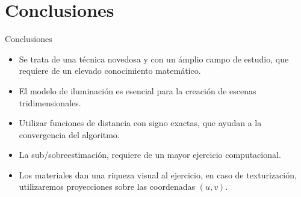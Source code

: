 \section{Conclusiones}

\SectionPage

\begin{frame}{Conclusiones}
    \begin{itemize}
        \item Se trata de una técnica novedosa y con un ámplio campo de estudio, que requiere de un elevado conocimiento matemático.
        \item El modelo de iluminación es esencial para la creación de escenas tridimensionales.
        \item Utilizar funciones de distancia con signo exactas, que ayudan a la convergencia del algoritmo.
        \item La sub/sobreestimación, requiere de un mayor ejercicio computacional.
        \item Los materiales dan una riqueza visual al ejercicio, en caso de texturización, utilizaremos proyecciones sobre las coordenadas \((u,v)\).
    \end{itemize}
\end{frame}